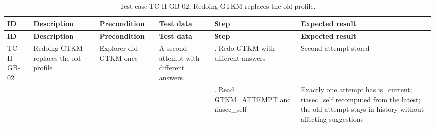 {\footnotesize{}\renewcommand{\arraystretch}{1.1}
\begin{longtable}{|>{\raggedright\arraybackslash}p{}|>{\raggedright\arraybackslash}p{}|>{\raggedright\arraybackslash}p{}|>{\raggedright\arraybackslash}p{}|>{\raggedright\arraybackslash}p{}|>{\raggedright\arraybackslash}p{}|}
\caption{Test case TC-H-GB-02, Redoing GTKM replaces the old profile.} \\
\hline
\textbf{ID} & \textbf{Description} & \textbf{Precondition} & \textbf{Test data} & \textbf{Step} & \textbf{Expected result} \\ \hline
\endfirsthead
\hline
\textbf{ID} & \textbf{Description} & \textbf{Precondition} & \textbf{Test data} & \textbf{Step} & \textbf{Expected result} \\ \hline
\endhead
TC-H-GB-02 & Redoing GTKM replaces the old profile & Explorer did GTKM once & A second attempt with different answers & 1. Redo GTKM with different answers & Second attempt stored \\ \cline{5-6}
 &  &  &  & 2. Read GTKM\_\allowbreak{}ATTEMPT and riasec\_self & Exactly one attempt has is\_current; riasec\_self recomputed from the latest; the old attempt stays in history without affecting suggestions \\ \hline
\end{longtable}
}

